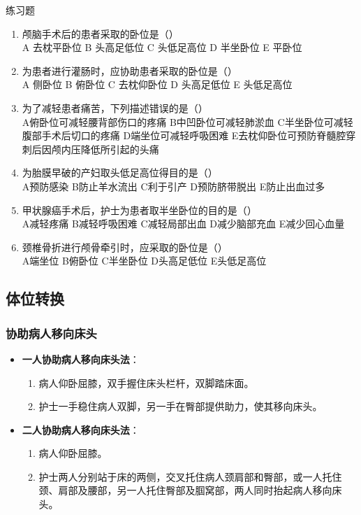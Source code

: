 \documentclass[11pt, a4paper]{ctexart}
\begin{document}
\begin{examplebox}{练习题}
	\begin{enumerate}
		\item 颅脑手术后的患者采取的卧位是（\qquad）\\
		      A 去枕平卧位 \quad B 头高足低位 \quad C 头低足高位 \quad D 半坐卧位 \quad E 平卧位
		\item 为患者进行灌肠时，应协助患者采取的卧位是（\qquad）\\
		      A 侧卧位 \quad B 俯卧位 \quad C 去枕仰卧位 \quad D 头高足低位 \quad E 头低足高位
		\item 为了减轻患者痛苦，下列描述错误的是（\qquad）\\
		      A俯卧位可减轻腰背部伤口的疼痛 \quad B中凹卧位可减轻肺淤血 \quad C半坐卧位可减轻腹部手术后切口的疼痛 \quad D端坐位可减轻呼吸困难 \quad E去枕仰卧位可预防脊髓腔穿刺后因颅内压降低所引起的头痛
		\item 为胎膜早破的产妇取头低足高位得目的是（\qquad）\\
		      A预防感染 \quad B防止羊水流出 \quad C利于引产 \quad D预防脐带脱出 \quad E防止出血过多
		\item 甲状腺癌手术后，护士为患者取半坐卧位的目的是（\qquad）\\
		      A减轻疼痛 \quad B减轻呼吸困难 \quad C减轻局部出血 \quad D减少脑部充血 \quad E减少回心血量
		\item 颈椎骨折进行颅骨牵引时，应采取的卧位是（\qquad）\\
		      A端坐位 \quad B俯卧位 \quad C半坐卧位 \quad D头高足低位 \quad E头低足高位
	\end{enumerate}
\end{examplebox}

\subsection{体位转换}
\subsubsection{协助病人移向床头}
\begin{itemize}
	\item \textbf{一人协助病人移向床头法}：
	      \begin{enumerate}
		      \item 病人仰卧屈膝，双手握住床头栏杆，双脚踏床面。
		      \item 护士一手稳住病人双脚，另一手在臀部提供助力，使其移向床头。
	      \end{enumerate}
	\item \textbf{二人协助病人移向床头法}：
	      \begin{enumerate}
		      \item 病人仰卧屈膝。
		      \item 护士两人分别站于床的两侧，交叉托住病人颈肩部和臀部，或一人托住颈、肩部及腰部，另一人托住臀部及腘窝部，两人同时抬起病人移向床头。
	      \end{enumerate}
\end{itemize}
\end{document}
